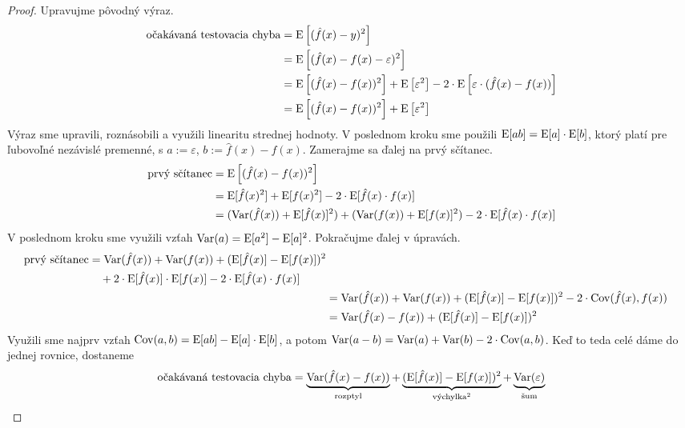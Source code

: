 \begin{proof}
  Upravujme pôvodný výraz.
  \begin{align}
    \chalg
      &= \E \left[ (\hat{f}(x) - y)^2 \right] \\
      &= \E \left[ (\hat{f}(x) - f(x) - \varepsilon)^2 \right] \\
      &= \E \left[ (\hat{f}(x) - f(x))^2 \right] + \E \left[ \varepsilon^2 \right] - 2 \cdot \E \left[ \varepsilon \cdot (\hat{f}(x) - f(x)) \right] \\
      &= \E \left[ (\hat{f}(x) - f(x))^2 \right] + \E \left[ \varepsilon^2 \right]
  \end{align}
  Výraz sme upravili, roznásobili a využili linearitu strednej hodnoty.
  V poslednom kroku sme použili $\E[ab] = \E[a] \cdot \E[b]$, ktorý
  platí pre ľubovoľné nezávislé premenné, s $a := \varepsilon$,
  $b := \hat{f}(x) - f(x)$. Zamerajme sa ďalej na prvý sčítanec.
  \begin{align}
    \text{prvý sčítanec}
      &= \E \left[ (\hat{f}(x) - f(x))^2 \right] \\
      &= \E[\hat{f}(x)^2] + \E[f(x)^2] - 2 \cdot \E[\hat{f}(x) \cdot f(x)] \\
      &= (\Var(\hat{f}(x)) + \E[\hat{f}(x)]^2) + (\Var(f(x)) + \E[f(x)]^2) - 2 \cdot \E[\hat{f}(x) \cdot f(x)]
  \end{align}
  V poslednom kroku sme využili vzťah $\Var(a) = \E[a^2] - \E[a]^2$.
  Pokračujme ďalej v úpravách.
  \begin{align}
    \begin{split}
      \text{prvý sčítanec}
        &= \Var(\hat{f}(x)) + \Var(f(x)) + (\E[\hat{f}(x)] - \E[f(x)])^2 \\
        &\quad + 2 \cdot \E[\hat{f}(x)] \cdot \E[f(x)] - 2 \cdot \E[\hat{f}(x) \cdot f(x)]
    \end{split} \\
    &= \Var(\hat{f}(x)) + \Var(f(x)) + (\E[\hat{f}(x)] - \E[f(x)])^2 - 2 \cdot \Cov(\hat{f}(x), f(x)) \\
    &= \Var(\hat{f}(x) - f(x)) + (\E[\hat{f}(x)] - \E[f(x)])^2
  \end{align}
  Využili sme najprv vzťah $\Cov(a, b) = \E[ab] - \E[a] \cdot \E[b]$,
  a potom $\Var(a - b) = \Var(a) + \Var(b) - 2 \cdot \Cov(a, b)$.
  Keď to teda celé dáme do jednej rovnice, dostaneme
  $$
  \chalg
      = \underbrace{\Var(\hat{f}(x) - f(x))}_{\text{\normalfont rozptyl}}
      + \underbrace{(\E[\hat{f}(x)] - \E[f(x)])^2}_{\text{\normalfont výchylka}^2}
      + \underbrace{\Var(\varepsilon)}_{\text{\normalfont šum}}
  $$
\end{proof}




